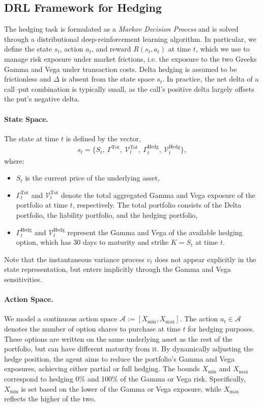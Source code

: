 \documentclass[a4paper,fleqn]{cas-dc}
\begin{document}
\subsection{DRL Framework for Hedging}

The hedging task is formulated as a \emph{Markov Decision Process} and is solved through a distributional deep-reinforcement learning algorithm. In particular, we define the state $s_t$, action $a_t$, and reward $R(s_t, a_t)$ at time $t$, which we use to manage risk exposure under market frictions, i.e. the exposure to the two Greeks Gamma and Vega under transaction costs. Delta hedging is assumed to be frictionless and $\Delta$ is absent from the state space $s_t$. In practice, the net delta of a call–put combination is typically small, as the call’s positive delta largely offsets the put’s negative delta.
\paragraph{State Space.} 
The state at time $t$ is defined by the vector,
\begin{align*}
    s_t = \{ S_t,\ \Gamma^{\text{Tot}},\ \mathcal{V}^{\text{Tot}}_t,\ \Gamma^{\text{Hedg}}_t,\ \mathcal{V}^{\text{Hedg}}_t \},
\end{align*}
where:
\begin{itemize}[noitemsep, left=10pt]
    \item $S_t$ is the current price of the underlying asset,
    \item $\Gamma^{\text{Tot}}_{t}$ and $\mathcal{V}^{\text{Tot}}_{t}$ denote the total aggregated Gamma and Vega exposure of the portfolio at time $t$, respectively. The total portfolio consists of the Delta portfolio, the liability portfolio, and the hedging portfolio,
    \item $\Gamma^{\text{Hedg}}_{t}$ and $\mathcal{V}^{\text{Hedg}}_{t}$ represent the Gamma and Vega of the available hedging option, which has 30 days to maturity and strike $K = S_t$ at time $t$.
\end{itemize}

Note that the instantaneous variance process $v_t$ does not appear explicitly in the state representation, but enters implicitly through the Gamma and Vega sensitivities.

\paragraph{Action Space.}
We model a continuous action space $\mathcal{A}:= [X_{\min}, X_{\max}]$. The action $a_t \in \mathcal A$ denotes the number of option shares to purchase at time $t$ for hedging purposes. These options are written on the same underlying asset as the rest of the portfolio, but can have different maturity from it. By dynamically adjusting the hedge position, the agent aims to reduce the portfolio's Gamma and Vega exposures, achieving either partial or full hedging. The bounds $X_{\min}$ and $X_{\max}$ correspond to hedging 0\% and 100\% of the Gamma or Vega risk. Specifically, $X_{\min}$ is set based on the lower of the Gamma or Vega exposure, while $X_{\max}$ reflects the higher of the two.
\end{document}

